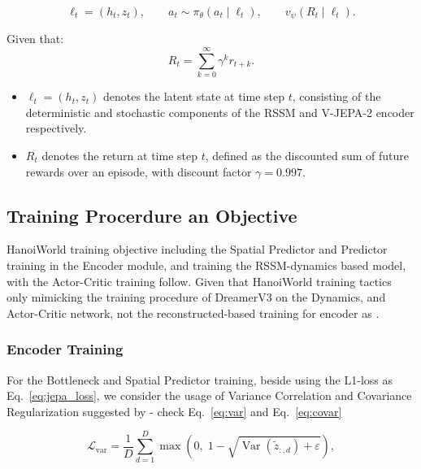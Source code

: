 \begin{equation}
\label{eq:actor_critic_latent}
\ell_t = (h_t, z_t), \qquad
a_t \sim \pi_\theta(a_t \mid \ell_t), \qquad
v_\psi(R_t \mid \ell_t).
\end{equation}

Given that:
\begin{equation}
R_t = \sum_{k=0}^{\infty} \gamma^k r_{t+k}.
\end{equation}

\begin{itemize}
    \item $\ell_t = (h_t, z_t)$ denotes the latent state at time step $t$,
    consisting of the deterministic and stochastic components of the RSSM and V-JEPA-2 encoder respectively.
    \item $R_t$ denotes the return at time step $t$, defined as the discounted
    sum of future rewards over an episode,
    with discount factor $\gamma = 0.997$.
\end{itemize}

\subsection{Training Procerdure an Objective }

HanoiWorld training objective including the Spatial Predictor and Predictor training in the Encoder module, and training the RSSM-dynamics based model, with the Actor-Critic training follow. Given that HanoiWorld training tactics only mimicking the training procedure of DreamerV3 on the Dynamics, and Actor-Critic network, not the reconstructed-based training for encoder as \cite{Hafner2023}.

\subsubsection*{Encoder Training}

For the Bottleneck and Spatial Predictor training, beside using the L1-loss as Eq.~\eqref{eq:jepa_loss}, we consider the usage of Variance Correlation and Covariance Regularization suggested by \cite{bardes_2022_vicreg} - check Eq.~\eqref{eq:var} and Eq.~\eqref{eq:covar}

\begin{equation}
\label{eq:var}
\mathcal{L}_{\text{var}}
=
\frac{1}{D}
\sum_{d=1}^{D}
\max\!\left(0,\;
1 - \sqrt{\operatorname{Var}\!\left(\tilde{z}_{:,d}\right) + \varepsilon}
\right),
\end{equation}

